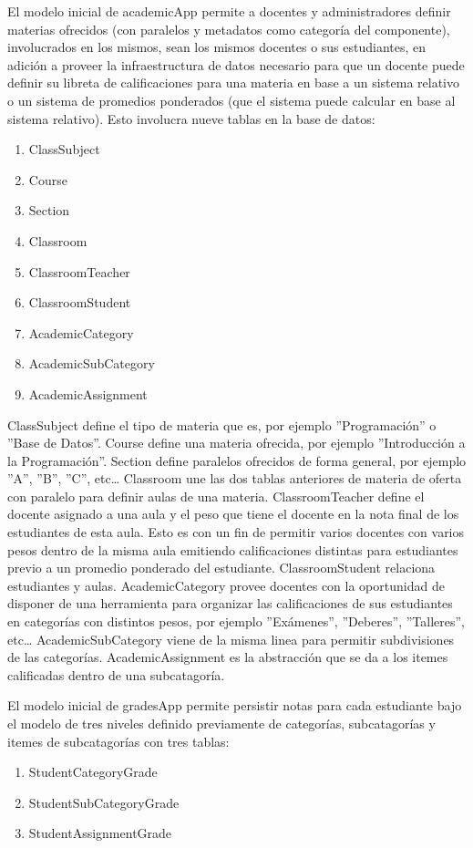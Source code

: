 El modelo inicial de academicApp permite a docentes y administradores definir materias ofrecidos (con paralelos y metadatos como categoría del componente), involucrados en los mismos, sean los mismos docentes o sus estudiantes, en adición a proveer la infraestructura de datos necesario para que un docente puede definir su libreta de calificaciones para una materia en base a un sistema relativo o un sistema de promedios ponderados (que el sistema puede calcular en base al sistema relativo). Esto involucra nueve tablas en la base de datos:
\begin{enumerate}
  \item ClassSubject
  \item Course
  \item Section
  \item Classroom
  \item ClassroomTeacher
  \item ClassroomStudent
  \item AcademicCategory
  \item AcademicSubCategory
  \item AcademicAssignment
\end{enumerate}
ClassSubject define el tipo de materia que es, por ejemplo ''Programación'' o ''Base de Datos''. Course define una materia ofrecida, por ejemplo ''Introducción a la Programación''. Section define paralelos ofrecidos de forma general, por ejemplo ''A'', ''B'', ''C'', etc\ldots{} Classroom une las dos tablas anteriores de materia de oferta con paralelo para definir aulas de una materia. ClassroomTeacher define el docente asignado a una aula y el peso que tiene el docente en la nota final de los estudiantes de esta aula. Esto es con un fin de permitir varios docentes con varios pesos dentro de la misma aula emitiendo calificaciones distintas para estudiantes previo a un promedio ponderado del estudiante. ClassroomStudent relaciona estudiantes y aulas. AcademicCategory provee docentes con la oportunidad de disponer de una herramienta para organizar las calificaciones de sus estudiantes en categorías con distintos pesos, por ejemplo ''Exámenes'', ''Deberes'', ''Talleres'', etc\ldots{} AcademicSubCategory viene de la misma linea para permitir subdivisiones de las categorías. AcademicAssignment es la abstracción que se da a los itemes calificadas dentro de una subcatagoría.

El modelo inicial de gradesApp permite persistir notas para cada estudiante bajo el modelo de tres niveles definido previamente de categorías, subcatagorías y itemes de subcatagorías con tres tablas:
\begin{enumerate}
  \item StudentCategoryGrade
  \item StudentSubCategoryGrade
  \item StudentAssignmentGrade
\end{enumerate}

